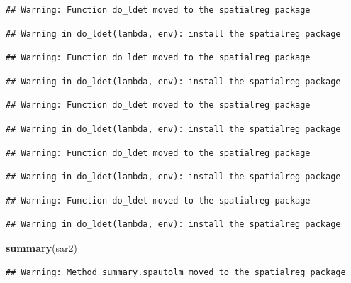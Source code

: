 \documentclass[11pt,]{article}
\newenvironment{Shaded}{\begin{snugshade}}{\end{snugshade}}
\newcommand{\KeywordTok}[1]{\textcolor[rgb]{0.13,0.29,0.53}{\textbf{#1}}}
\newcommand{\NormalTok}[1]{#1}
\begin{document}
\begin{verbatim}
## Warning: Function do_ldet moved to the spatialreg package
\end{verbatim}

\begin{verbatim}
## Warning in do_ldet(lambda, env): install the spatialreg package
\end{verbatim}

\begin{verbatim}
## Warning: Function do_ldet moved to the spatialreg package
\end{verbatim}

\begin{verbatim}
## Warning in do_ldet(lambda, env): install the spatialreg package
\end{verbatim}

\begin{verbatim}
## Warning: Function do_ldet moved to the spatialreg package
\end{verbatim}

\begin{verbatim}
## Warning in do_ldet(lambda, env): install the spatialreg package
\end{verbatim}

\begin{verbatim}
## Warning: Function do_ldet moved to the spatialreg package
\end{verbatim}

\begin{verbatim}
## Warning in do_ldet(lambda, env): install the spatialreg package
\end{verbatim}

\begin{verbatim}
## Warning: Function do_ldet moved to the spatialreg package
\end{verbatim}

\begin{verbatim}
## Warning in do_ldet(lambda, env): install the spatialreg package
\end{verbatim}

\begin{Shaded}
\begin{Highlighting}[]
\KeywordTok{summary}\NormalTok{(sar2)}
\end{Highlighting}
\end{Shaded}

\begin{verbatim}
## Warning: Method summary.spautolm moved to the spatialreg package
\end{verbatim}
\end{document}
